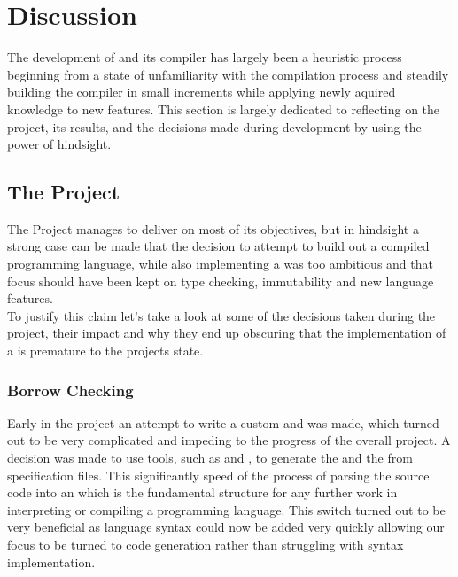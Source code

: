 \section{Discussion}
\label{sec:Discussion}

The development of \lang{} and its compiler has largely been a heuristic process
beginning from a state of unfamiliarity with the compilation process and steadily
building the compiler in small increments while applying newly aquired knowledge to
new features. This section is largely dedicated to reflecting on the project, its
results, and the decisions made during development by using the power of hindsight. 

\subsection{The Project}

The Project manages to deliver on most of its objectives, but in hindsight a strong
case can be made that the decision to attempt to build out a compiled programming
language, while also implementing a \borrowChecker{} was too ambitious and that focus
should have been kept on type checking, immutability and new language features. \\

To justify this claim let's take a look at some of the decisions taken during the
project, their impact and why they end up obscuring that the implementation of a
\borrowChecker{} is premature to the projects state.

\subsubsection{Borrow Checking}

Early in the project an attempt to write a custom \lexer{} and \parser{} was
made, which turned out to be very complicated and impeding to the progress of the
overall project. A decision was made to use tools, such as \lexerGen{} and
\parserGen{}, to generate the \lexer{} and the \parser{} from specification files.
This significantly speed of the process of parsing the source code into an \ast{}
which is the fundamental structure for any further work in interpreting or compiling
a programming language. This switch turned out to be very beneficial as language
syntax could now be added very quickly allowing our focus to be turned to code
generation rather than struggling with syntax implementation. \\ 

